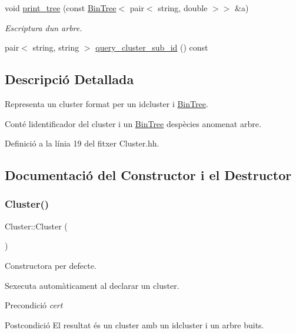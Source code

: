\begin{DoxyCompactItemize}
void \hyperlink{class_cluster_adc8ff607dd745107b5b6a454ac196e55}{print\+\_\+tree} (const \hyperlink{class_bin_tree}{Bin\+Tree}$<$ pair$<$ string, double $>$$>$ \&a)
\begin{DoxyCompactList}\small\item\em Escriptura d\textquotesingle{}un arbre. \end{DoxyCompactList}\item 
pair$<$ string, string $>$ \hyperlink{class_cluster_ae8c8a1d94203dccfd6fbbc5389a1e0ec}{query\+\_\+cluster\+\_\+sub\+\_\+id} () const
\end{DoxyCompactItemize}


\subsection{Descripció Detallada}
Representa un cluster format per un idcluster i \hyperlink{class_bin_tree}{Bin\+Tree}. 

Conté l\textquotesingle{}identificador del cluster i un \hyperlink{class_bin_tree}{Bin\+Tree} d\textquotesingle{}espècies anomenat arbre. 

Definició a la línia 19 del fitxer Cluster.\+hh.



\subsection{Documentació del Constructor i el Destructor}
\mbox{\label{class_cluster_aee7feb1d599d4c8fda6c3ee83e86ba81}} 
\subsubsection{\texorpdfstring{Cluster()}{Cluster()}\hspace{0.1cm}{\footnotesize\ttfamily [1/3]}}
{\footnotesize\ttfamily Cluster\+::\+Cluster (\begin{DoxyParamCaption}{ }\end{DoxyParamCaption})}



Constructora per defecte. 

S\textquotesingle{}executa automàticament al declarar un cluster.

\begin{DoxyPrecond}{Precondició}
{\itshape cert} 
\end{DoxyPrecond}
\begin{DoxyPostcond}{Postcondició}
El resultat és un cluster amb un idcluster i un arbre buits. 
\end{DoxyPostcond}


